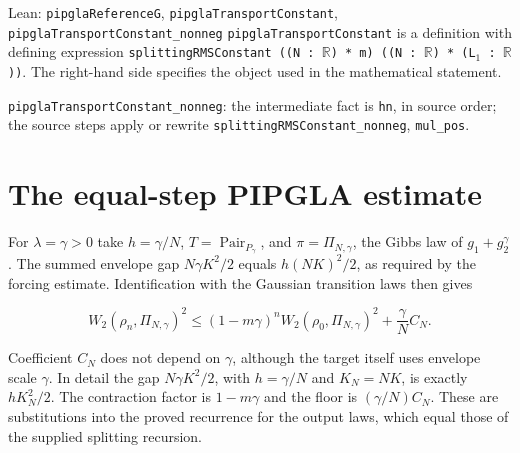 \documentclass[11pt,a4paper]{article}
\begin{document}
\begin{leanbox}{Lean: \texttt{pipglaReferenceG}, \texttt{pipglaTransportConstant}, \texttt{pipglaTransportConstant\_\allowbreak{}nonneg}}
\texttt{pipgla\allowbreak{}Transport\allowbreak{}Constant} is a definition with defining expression \texttt{splitting\allowbreak{}RMSConstant ((N : \ensuremath{\mathbb R}) * m) ((N : \ensuremath{\mathbb R}) * (L\ensuremath{{}_{1}} : \ensuremath{\mathbb R}))}. The right-hand side specifies the object used in the mathematical statement.



\texttt{pipgla\allowbreak{}Transport\allowbreak{}Constant\_\allowbreak{}nonneg}: the intermediate fact is \texttt{hn}, in source order; the source steps apply or rewrite \texttt{splitting\allowbreak{}RMSConstant\_\allowbreak{}nonneg}, \texttt{mul\_\allowbreak{}pos}.
\end{leanbox}

\section{\texorpdfstring{The equal-step PIPGLA estimate}{The equal-step PIPGLA estimate}}


For \(\lambda=\gamma>0\) take \(h=\gamma/N\), \(T=\operatorname{Pair}_{P_\gamma}\), and \(\pi=\Pi_{N,\gamma}\), the Gibbs law of \(g_1+g_2^\gamma\). The summed envelope gap \(N\gamma K^2/2\) equals \(h(NK)^2/2\), as required by the forcing estimate. Identification with the Gaussian transition laws then gives

\[W_2(\rho_n,\Pi_{N,\gamma})^2\le(1-m\gamma)^nW_2(\rho_0,\Pi_{N,\gamma})^2+\frac\gamma N C_N.\]

Coefficient \(C_N\) does not depend on \(\gamma\), although the target itself uses envelope scale \(\gamma\). In detail the gap \(N\gamma K^2/2\), with \(h=\gamma/N\) and \(K_N=NK\), is exactly \(hK_N^2/2\). The contraction factor is \(1-m\gamma\) and the floor is \((\gamma/N)C_N\). These are substitutions into the proved recurrence for the output laws, which equal those of the supplied splitting recursion.
\end{document}
